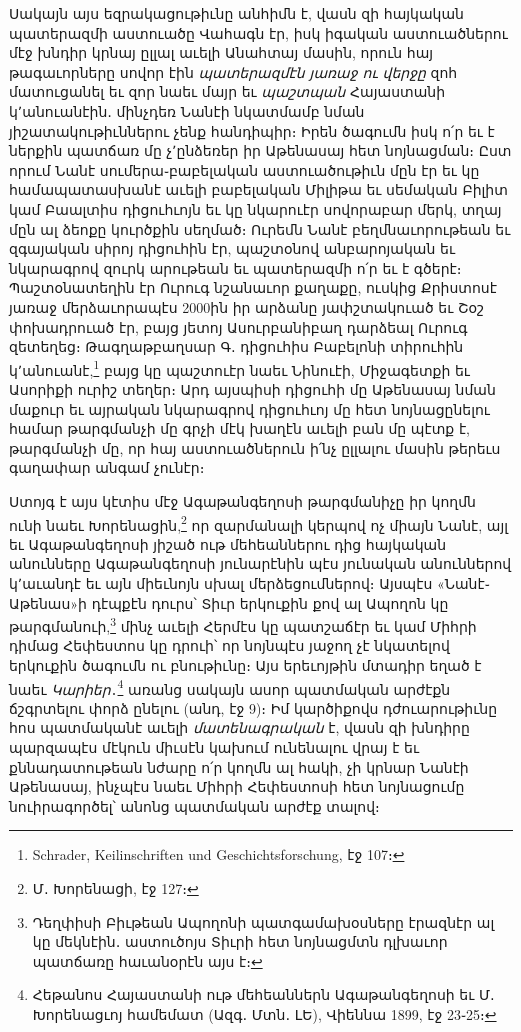 \documentclass{article}
\begin{document}
{Սակայն այս եզրակացութիւնը անհիմն է, վասն զի հայկական պատերազմի աստուածը Վահագն էր, իսկ իգական աստուածներու մէջ խնդիր կրնայ ըլլալ աւելի Անահտայ մասին, որուն հայ թագաւորները սովոր էին \emph{պատերազմէն յառաջ ու վերջը} զոհ մատուցանել եւ զոր նաեւ մայր եւ \emph{պաշտպան} Հայաստանի կ՚անուանէին․ մինչդեռ Նանէի նկատմամբ նման յիշատակութիւններու չենք հանդիպիր։ Իրեն ծագումն իսկ ո՛ր եւ է ներքին պատճառ մը չ՚ընձեռեր իր Աթենասայ հետ նոյնացման։ Ըստ որում Նանէ սումերա֊բաբելական աստուածութիւն մըն էր եւ կը համապատասխանէ աւելի բաբելական Միլիթա եւ սեմական Բիլիտ կամ Բաալտիս դիցուհւոյն եւ կը նկարուէր սովորաբար մերկ, տղայ մըն ալ ձեոքը կուրծքին սեղմած։ Ուրեմն Նանէ բեղմնաւորութեան եւ զգայական սիրոյ դիցուհին էր, պաշտօնով անբարոյական եւ նկարագրով զուրկ արութեան եւ պատերազմի ո՛ր եւ է գծերէ։ Պաշտօնատեղին էր Ուրուգ նշանաւոր քաղաքը, ուսկից Քրիստոսէ յառաջ մերձաւորապէս 2000ին իր արձանը յափշտակուած եւ Շօշ փոխադրուած էր, բայց յետոյ Ասուրբանիբաղ դարձեալ Ուրուգ զետեղեց։ Թագղաթբաղսար Գ․ դիցուհիս Բաբելոնի տիրուհին կ՚անուանէ,\footnote{Schrader, Keilinschriften und Geschichtsforschung, էջ 107։} բայց կը պաշտուէր նաեւ Նինուէի, Միջագետքի եւ Ասորիքի ուրիշ տեղեր։ Արդ այսպիսի դիցուհի մը Աթենասայ նման մաքուր եւ այրական նկարագրով դիցուհւոյ մը հետ նոյնացընելու համար թարգմանչի մը գրչի մէկ խաղէն աւելի բան մը պէտք է, թարգմանչի մը, որ հայ աստուածներուն ի՛նչ ըլլալու մասին թերեւս գաղափար անգամ չունէր։

Ստոյգ է այս կէտիս մէջ Ագաթանգեղոսի թարգմանիչը իր կողմն ունի նաեւ Խորենացին,\footnote{Մ․ Խորենացի, էջ 127։} որ զարմանալի կերպով ոչ միայն Նանէ, այլ եւ Ագաթանգեղոսի յիշած ութ մեհեաններու դից հայկական անունները Ագաթանգեղոսի յունարէնին պէս յունական անուններով կ՚աւանդէ եւ այն միեւնոյն սխալ մերձեցումներով։ Այսպէս «Նանէ֊Աթենաս»ի դէպքէն դուրս՝ Տիւր երկուքին քով ալ Ապողոն կը թարգմանուի,\footnote{Դեղփիսի Բիւթեան Ապողոնի պատգամախօսները էրազնէր ալ կը մեկնէին․ աստուծոյս Տիւրի հետ նոյնացմտն դլխաւոր պատճառը հաւանօրէն այս է։} մինչ աւելի Հերմէս կը պատշաճէր եւ կամ Միհրի դիմաց Հեփեստոս կը դրուի՝ որ նոյնպէս յաջող չէ նկատելով երկուքին ծագումն ու բնութիւնը։ Այս երեւոյթին մտադիր եղած է նաեւ \emph{Կարիեր}․\footnote{Հեթանոս Հայաստանի ութ մեհեաններն Ագաթանգեղոսի եւ Մ․ Խորենացւոյ համեմատ (Ազգ․ Մտն․ ԼԵ), Վիեննա 1899, էջ 23֊25։} առանց սակայն ասոր պատմական արժէքն ճշգրտելու փորձ ընելու (անդ, էջ 9)։ Իմ կարծիքովս դժուարութիւնը հոս պատմականէ աւելի \emph{մատենագրական} է, վասն զի խնդիրը պարզապէս մէկուն միւսէն կախում ունենալու վրայ է եւ քննադատութեան նժարը ո՛ր կողմն ալ հակի, չի կրնար Նանէի Աթենասայ, ինչպէս նաեւ Միհրի Հեփեստոսի հետ նոյնացումը նուիրագործել՝ անոնց պատմական արժէք տալով։

}
\end{document}
